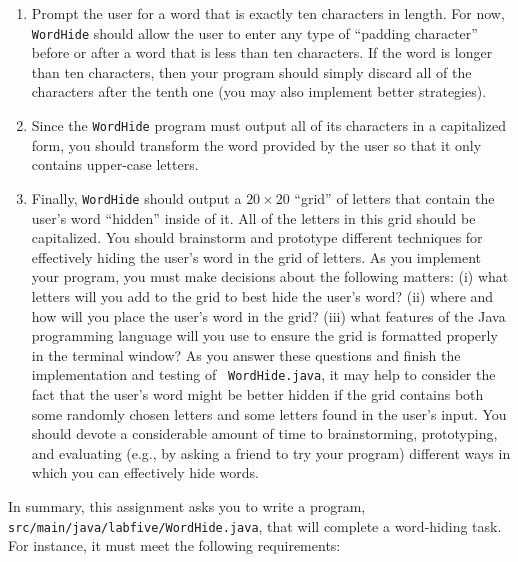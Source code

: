 \documentclass[11pt]{article}
\newcommand{\mainprogramsource}{\lstinline{src/main/java/labfive/WordHide.java}}
\begin{document}
\vspace*{-.1in}

\begin{enumerate}

  \itemsep0in

  \item Prompt the user for a word that is exactly ten characters in length. For
    now, {\tt WordHide} should allow the user to enter any type of ``padding
    character'' before or after a word that is less than ten characters. If the
    word is longer than ten characters, then your program should simply discard
    all of the characters after the tenth one (you may also implement better
    strategies).

  \item Since the {\tt WordHide} program must output all of its characters in a
    capitalized form, you should transform the word provided by the user so that
    it only contains upper-case letters.

  \item Finally, {\tt WordHide} should output a $20 \times 20$ ``grid'' of
    letters that contain the user's word ``hidden'' inside of it. All of the
    letters in this grid should be capitalized. You should brainstorm and
    prototype different techniques for effectively hiding the user's word in the
    grid of letters. As you implement your program, you must make decisions
    about the following matters: (i) what letters will you add to the grid to
    best hide the user's word? (ii) where and how will you place the user's word
    in the grid? (iii) what features of the Java programming language will you
    use to ensure the grid is formatted properly in the terminal window? As you
    answer these questions and finish the implementation and testing of {\tt
    WordHide.java}, it may help to consider the fact that the user's word might
    be better hidden if the grid contains both some randomly chosen letters and
    some letters found in the user's input. You should devote a considerable
    amount of time to brainstorming, prototyping, and evaluating (e.g., by
    asking a friend to try your program) different ways in which you can
    effectively hide words.

\end{enumerate}

\vspace*{-.1in}

In summary, this assignment asks you to write a program, \mainprogramsource{},
that will complete a word-hiding task. For instance, it must meet the following
requirements:
\end{document}
